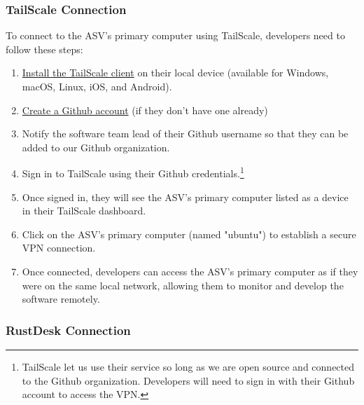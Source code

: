 \subsubsection{TailScale Connection}
To connect to the ASV's primary computer using TailScale, developers need to follow these steps:

\begin{enumerate}
    \item \href{https://tailscale.com/download/}{Install the TailScale client} on their local device (available for Windows, macOS, Linux, iOS, and Android).
    \item \href{https://github.com/signup}{Create a Github account} (if they don't have one already)
    \item Notify the software team lead of their Github username so that they can be added to our Github organization.
    \item Sign in to TailScale using their Github credentials.\footnote{TailScale let us use their service so long as we are open source and connected to the Github organization. Developers will need to sign in with their Github account to access the VPN.}
    \item Once signed in, they will see the ASV's primary computer listed as a device in their TailScale dashboard.
    \item Click on the ASV's primary computer (named "ubuntu") to establish a secure VPN connection.
    \item Once connected, developers can access the ASV's primary computer as if they were on the same local network, allowing them to monitor and develop the software remotely.
\end{enumerate}

\subsubsection{RustDesk Connection}


